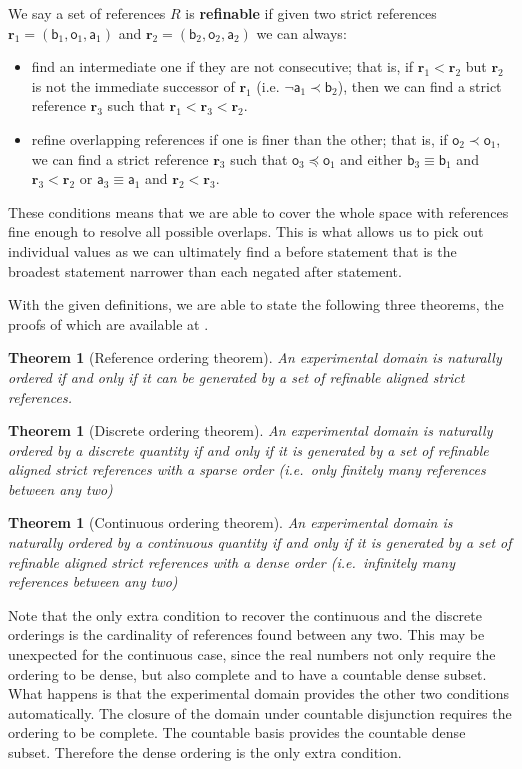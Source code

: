 \documentclass[submission,copyright,creativecommons]{eptcs}
\def\NOT{\neg}
\newcommand{\stmt}[1][s] {\mathsf{#1}} %
\def\narrower{\preccurlyeq} %
\def\snarrower{\prec}
\newcommand{\refStmt}[1][r]{\textbf{#1}}
\newtheorem{thrm}[equation]{Theorem}
\begin{document}
We say a set of references $R$ is \textbf{refinable} if given two strict references $\refStmt_1 = ( \stmt[b]_1, \stmt[o]_1, \stmt[a]_1)$ and $\refStmt_2 = ( \stmt[b]_2, \stmt[o]_2, \stmt[a]_2)$ we can always:
\begin{itemize}
	\item find an intermediate one if they are not consecutive; that is, if $\refStmt[r]_1 < \refStmt[r]_2$ but $\refStmt[r]_2$ is not the immediate successor of $\refStmt[r]_1$ (i.e. $\NOT \stmt[a]_1 \snarrower \stmt[b]_2$), then we can find a strict reference $\refStmt_3$ such that $\refStmt[r]_1 < \refStmt[r]_3 < \refStmt[r]_2$.
	\item refine overlapping references if one is finer than the other; that is, if $\stmt[o]_2 \snarrower \stmt[o]_1$, we can find a strict reference $\refStmt_3$ such that $\stmt[o]_3 \narrower \stmt[o]_1$ and either $\stmt[b]_3 \equiv \stmt[b]_1$ and $\refStmt_3 < \refStmt_2$ or $\stmt[a]_3 \equiv \stmt[a]_1$ and $\refStmt_2 < \refStmt_3$.
\end{itemize}
These conditions means that we are able to cover the whole space with references fine enough to resolve all possible overlaps. This is what allows us to pick out individual values as we can ultimately find a before statement that is the broadest statement narrower than each negated after statement.

With the given definitions, we are able to state the following three theorems, the proofs of which are available at \cite{Carc3}.
\begin{thrm}[Reference ordering theorem]
	An experimental domain is naturally ordered if and only if it can be generated by a set of refinable aligned strict references.
\end{thrm}
\begin{thrm}[Discrete ordering theorem]
	An experimental domain is naturally ordered by a discrete quantity if and only if it is generated by a set of refinable aligned strict references with a sparse order (i.e.~only finitely many references between any two)
\end{thrm}
\begin{thrm}[Continuous ordering theorem]
	An experimental domain is naturally ordered by a continuous quantity if and only if it is generated by a set of refinable aligned strict references with a dense order (i.e.~infinitely many references between any two)
\end{thrm}

Note that the only extra condition to recover the continuous and the discrete orderings is the cardinality of references found between any two. This may be unexpected for the continuous case, since the real numbers not only require the ordering to be dense, but also complete and to have a countable dense subset. What happens is that the experimental domain provides the other two conditions automatically. The closure of the domain under countable disjunction requires the ordering to be complete. The countable basis provides the countable dense subset. Therefore the dense ordering is the only extra condition.
\end{document}
